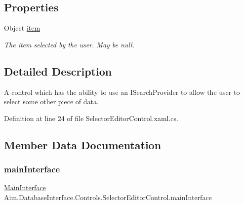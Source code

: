 \subsection*{Properties}
\begin{DoxyCompactItemize}
\item 
Object \mbox{\hyperlink{class_aim_1_1_database_interface_1_1_controls_1_1_selector_editor_control_a50c8b48f2ce84e187f533b028feae0aa}{item}}
\begin{DoxyCompactList}\small\item\em The item selected by the user. May be null. \end{DoxyCompactList}\end{DoxyCompactItemize}


\subsection{Detailed Description}
A control which has the ability to use an I\+Search\+Provider to allow the user to select some other piece of data. 



Definition at line 24 of file Selector\+Editor\+Control.\+xaml.\+cs.



\subsection{Member Data Documentation}
\mbox{\label{class_aim_1_1_database_interface_1_1_controls_1_1_selector_editor_control_a9a3a630a14c28582df8e0fb52f5b824b}} 
\subsubsection{\texorpdfstring{main\+Interface}{mainInterface}}
{\footnotesize\ttfamily \mbox{\hyperlink{class_aim_1_1_database_interface_1_1_windows_1_1_main_interface}{Main\+Interface}} Aim.\+Database\+Interface.\+Controls.\+Selector\+Editor\+Control.\+main\+Interface}



